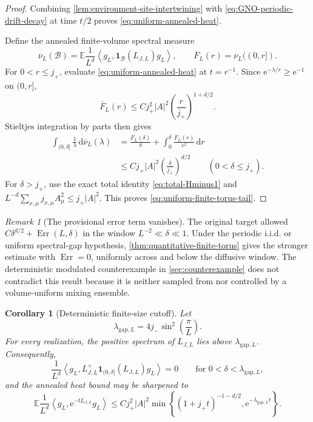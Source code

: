\documentclass[11pt]{article}
\newtheorem{corollary}[theorem]{Corollary}
\theoremstyle{definition}
\theoremstyle{remark}
\newtheorem{remark}[theorem]{Remark}
\newcommand{\e}{\mathrm e}
\newcommand{\E}{\mathbb E}
\newcommand{\ip}[2]{\left\langle #1,#2\right\rangle}
\newcommand{\abs}[1]{\left\lvert #1\right\rvert}
\newcommand{\dd}{\,\mathrm d}
\begin{document}
\begin{proof}
Combining \cref{lem:environment-site-intertwining} with \eqref{eq:GNO-periodic-drift-decay} at time $t/2$ proves \eqref{eq:uniform-annealed-heat}.

Define the annealed finite-volume spectral measure
\[
 \overline\nu_L(\mathcal B)
 =\E\frac1{L^d}\ip{g_L}{\bm{1}_{\mathcal B}(L_{J,L})g_L},
 \qquad
 \overline F_L(r)=\overline\nu_L((0,r]).
\]
For $0<r\le j_+$, evaluate \eqref{eq:uniform-annealed-heat} at $t=r^{-1}$.  Since $\e^{-\lambda/r}\ge\e^{-1}$ on $(0,r]$,
\begin{equation}
 \overline F_L(r)
 \le Cj_+^2\abs{A}^2\left(\frac r{j_+}\right)^{1+d/2}.
 \label{eq:annealed-spectral-edge}
\end{equation}
Stieltjes integration by parts then gives
\begin{align}
 \int_{(0,\delta]}\frac1\lambda\dd\overline\nu_L(\lambda)
 &=\frac{\overline F_L(\delta)}\delta
 +\int_0^\delta\frac{\overline F_L(r)}{r^2}\dd r\\
 &\le Cj_+\abs{A}^2
 \left(\frac\delta{j_+}\right)^{d/2}
 \qquad (0<\delta\le j_+).
\end{align}
For $\delta>j_+$, use the exact total identity \eqref{eq:total-Hminus1} and
$L^{-d}\sum_{x,\mu}j_{x,\mu}A_\mu^2\le j_+\abs{A}^2$.  This proves \eqref{eq:uniform-finite-torus-tail}.
\end{proof}

\begin{remark}[The provisional error term vanishes]
The original target allowed
$C\delta^{d/2}+\operatorname{Err}(L,\delta)$ in the window $L^{-2}\ll\delta\ll1$.  Under the periodic i.i.d. or uniform spectral-gap hypothesis, \cref{thm:quantitative-finite-torus} gives the stronger estimate with $\operatorname{Err}=0$, uniformly across and below the diffusive window.  The deterministic modulated counterexample in \cref{sec:counterexample} does not contradict this result because it is neither sampled from nor controlled by a volume-uniform mixing ensemble.
\end{remark}


\begin{corollary}[Deterministic finite-size cutoff]
\label{cor:finite-size-cutoff}
Let
\begin{equation}
 \lambda_{\mathrm{gap},L}=4j_-\sin^2\left(\frac{\pi}{L}\right).
 \label{eq:finite-size-gap}
\end{equation}
For every realization, the positive spectrum of $L_{J,L}$ lies above
$\lambda_{\mathrm{gap},L}$.  Consequently,
\begin{equation}
 \frac1{L^d}\ip{g_L}{L_{J,L}^+
 \bm{1}_{(0,\delta]}(L_{J,L})g_L}=0
 \qquad\text{for }0<\delta<\lambda_{\mathrm{gap},L},
 \label{eq:exact-subgap-tail-zero}
\end{equation}
and the annealed heat bound may be sharpened to
\begin{equation}
 \E\frac1{L^d}\ip{g_L}{\e^{-tL_{J,L}}g_L}
 \le Cj_+^2\abs{A}^2
 \min\left\{(1+j_+t)^{-1-d/2},
 \e^{-\lambda_{\mathrm{gap},L}t}\right\}.
 \label{eq:finite-size-heat-crossover}
\end{equation}
\end{corollary}
\end{document}
